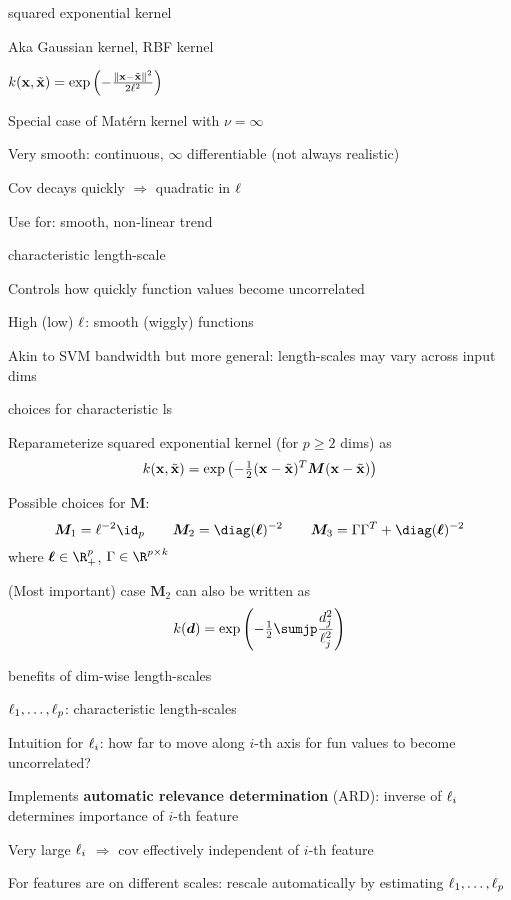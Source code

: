 \documentclass[11pt,compress,t,notes=noshow, xcolor=table]{beamer}
\begin{document}
\begin{framei}{squared exponential kernel}
\item Aka Gaussian kernel, RBF kernel
\item $k(\mathbf{x}, \tilde{\mathbf{x}}) = \exp \left(-\frac{\| \mathbf{x} - \tilde{\mathbf{x}} \|^2}{2\ell^2} \right)$
\item Special case of Matérn kernel with $\nu = \infty$
\item Very smooth: continuous, $\infty$ differentiable (not always realistic)
\item Cov decays quickly $\Rightarrow$ quadratic in $\ell$
\item Use for: smooth, non-linear trend
\end{framei}

\begin{framei}[sep=L]{characteristic length-scale}
\item Controls how quickly function values become uncorrelated
\item High (low) $\ell$: smooth (wiggly) functions
\vfill
{}
\item Akin to SVM bandwidth but more general: length-scales may vary across input dims
\end{framei}

\begin{framei}[sep=L]{choices for characteristic ls}
\item Reparameterize squared exponential kernel (for $p \geq 2$ dims) as
$$
k(\mathbf{x}, \tilde{\mathbf{x}}) = \exp \left(- \tfrac{1}{2}(\mathbf{x} - \tilde{\mathbf{x}})^T\bm{M} (\mathbf{x} - \tilde{\mathbf{x}} )\right)
$$
\item Possible choices for $\bm{M}$:
$$
\bm{M}_1 = \ls^{-2}\id_p \qquad \bm{M}_2 = \diag(\bm{\ls})^{-2} \qquad \bm{M}_3 = \Gamma \Gamma^T + \diag(\bm{\ls})^{-2}
$$
where $\bm{\ls} \in \R^p_+$, $\Gamma \in \R^{p \times k}$ 
\item (Most important) case $\bm{M}_2$ can also be written as
$$
  k(\bm{d}) = \exp \left(- \tfrac{1}{2} \sumjp \frac{d_j^2}{\ell_j^2} \right)
$$
\end{framei}

\begin{framei}[sep=L]{benefits of dim-wise length-scales}
\item $\ell_1,\dots, \ell_p$: characteristic length-scales
\item Intuition for $\ell_i$: how far to move along $i$-th axis for fun values to become uncorrelated?
\item Implements \textbf{automatic relevance determination} (ARD): inverse of $\ell_i$ determines importance of $i$-th feature
\item Very large $\ell_i$ $\Rightarrow$ cov effectively independent of $i$-th feature
\item For features are on different scales: rescale automatically by estimating $\ell_1,\dots, \ell_p$ 
\end{framei}
\end{document}
